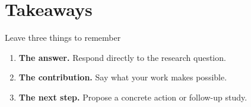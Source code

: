 \section{Takeaways}
\begin{frame}{Leave three things to remember}
\begin{enumerate}\setlength{\itemsep}{6mm}
\item \textbf{The answer.} Respond directly to the research question.
\item \textbf{The contribution.} Say what your work makes possible.
\item \textbf{The next step.} Propose a concrete action or follow-up study.
\end{enumerate}
\end{frame}

